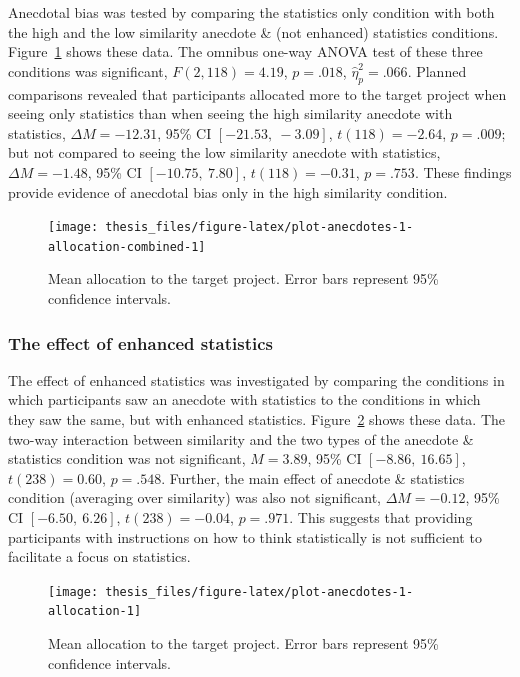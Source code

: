 \documentclass[a4paper, nobind, dvipsnames]{templates/ociamthesis}
\theoremstyle{definition}
\theoremstyle{definition}
\theoremstyle{definition}
\theoremstyle{definition}
\theoremstyle{remark}
\begin{document}
Anecdotal bias was tested by comparing the statistics only condition with both
the high and the low similarity anecdote \& (not enhanced) statistics conditions.
Figure~\ref{fig:plot-anecdotes-1-allocation-combined} shows these data. The
omnibus one-way ANOVA test of these three conditions was significant,
\(F(2, 118) = 4.19\), \(p = .018\), \(\hat{\eta}^2_p = .066\). Planned comparisons revealed that
participants allocated more to the target project when seeing only statistics
than when seeing the high similarity anecdote with statistics,
\(\Delta M = -12.31\), 95\% CI \([-21.53,~-3.09]\), \(t(118) = -2.64\), \(p = .009\); but not compared
to seeing the low similarity anecdote with statistics,
\(\Delta M = -1.48\), 95\% CI \([-10.75,~7.80]\), \(t(118) = -0.31\), \(p = .753\). These findings
provide evidence of anecdotal bias only in the high similarity condition.



\begin{figure}
\texttt{[image: thesis\_files/figure-latex/plot-anecdotes-1-allocation-combined-1]} \caption{Mean allocation to the target project. Error bars represent 95\% confidence intervals.}\label{fig:plot-anecdotes-1-allocation-combined}
\end{figure}

\subsubsection{The effect of enhanced statistics}

The effect of enhanced statistics was investigated by comparing the conditions
in which participants saw an anecdote with statistics to the conditions in which
they saw the same, but with enhanced statistics.
Figure~\ref{fig:plot-anecdotes-1-allocation} shows these data. The two-way
interaction between similarity and the two types of the anecdote \& statistics
condition was not significant,
\(M = 3.89\), 95\% CI \([-8.86,~16.65]\), \(t(238) = 0.60\), \(p = .548\). Further, the main
effect of anecdote \& statistics condition (averaging over similarity) was also
not significant, \(\Delta M = -0.12\), 95\% CI \([-6.50,~6.26]\), \(t(238) = -0.04\), \(p = .971\). This
suggests that providing participants with instructions on how to think
statistically is not sufficient to facilitate a focus on statistics.



\begin{figure}
\texttt{[image: thesis\_files/figure-latex/plot-anecdotes-1-allocation-1]} \caption{Mean allocation to the target project. Error bars represent 95\% confidence intervals.}\label{fig:plot-anecdotes-1-allocation}
\end{figure}
\end{document}
